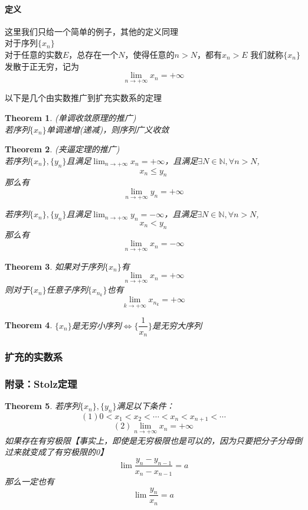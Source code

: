 \documentclass[11pt,hyperref,a4paper,UTF8]{ctexart}
\newtheorem{theorem}{Theorem}[subsection]
\begin{document}
\begin{CJK}{UTF8}{gkai}
\paragraph{定义\\}
这里我们只给一个简单的例子，其他的定义同理\\

对于序列$\{x_n\}$\\
对于任意的实数$E$，总存在一个$N$，使得任意的$n>N$，都有$x_n > E$
我们就称$\{x_n\}$发散于正无穷，记为
\[\lim_{n\to +\infty}x_n=+\infty\]

以下是几个由实数推广到扩充实数系的定理\\
\begin{theorem}(单调收敛原理的推广)\\

若序列$\{x_n\}$单调递增(递减)，则序列广义收敛\\
\end{theorem}
\begin{theorem}(夹逼定理的推广)\\

若序列$\{x_n\},\{y_n\}$且满足$\lim_{n\to +\infty}x_n=+\infty$，且满足$\exists N\in \mathbb{N},\forall n > N$,
\[x_n\leq y_n\]
那么有
\[\lim_{n\to +\infty}y_n=+\infty\]

若序列$\{x_n\},\{y_n\}$且满足$\lim_{n\to +\infty}y_n=-\infty$，且满足$\exists N\in \mathbb{N},\forall n > N$,
\[x_n<y_n\]
那么有
\[\lim_{n\to +\infty}x_n=-\infty\]
\end{theorem}
\begin{theorem}

如果对于序列$\{x_n\}$有
\[\lim_{n\to +\infty}x_n=+\infty\]
则对于$\{x_n\}$任意子序列$\{x_{n_k}\}$也有
\[\lim_{k\to +\infty}x_{n_k}=+\infty\]
\end{theorem}
\begin{theorem}

$\{x_n\}$是无穷小序列$\Leftrightarrow\{\dfrac{1}{x_n}\}$是无穷大序列\\
\end{theorem}

\subsubsection{扩充的实数系}
\subsubsection{附录：Stolz定理}
\begin{theorem}
若序列$\{x_n\},\{y_n\}$满足以下条件：
\[(1)0<x_1<x_2<\cdots<x_n<x_{n+1}<\cdots\]
\[(2)\lim_{n\to +\infty}x_n=+\infty\]
如果存在有穷极限【事实上，即使是无穷极限也是可以的，因为只要把分子分母倒过来就变成了有穷极限的0】\\
\[\lim\frac{y_n-y_{n-1}}{x_n-x_{n-1}}=a\]
那么一定也有
\[\lim\frac{y_n}{x_n}=a\]
\end{theorem}

\end{CJK}
\end{document}
